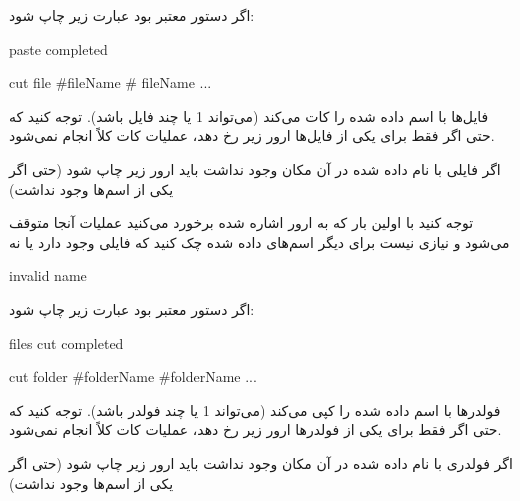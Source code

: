 \documentclass[]{article}
\begin{document}
اگر دستور معتبر بود عبارت زیر چاپ شود:

\begin{tcolorbox}[boxrule=0pt]
	\begin{latin}
  	  \large{
 paste completed
		}
	\end{latin}
\end{tcolorbox}

\begin{tcolorbox}[boxrule=0pt]
	\begin{latin}
  	  \large{
 cut file \#fileName \# fileName ...
		}
	\end{latin}
\end{tcolorbox}


فایل‌ها با اسم داده شده را کات می‌کند (می‌تواند 1 یا چند فایل باشد). توجه کنید که حتی اگر فقط برای یکی از فایل‌ها ارور زیر رخ دهد، عملیات کات کلاً انجام نمی‌شود.

اگر فایلی با نام داده شده در آن مکان وجود نداشت باید ارور زیر چاپ شود (حتی اگر یکی از اسم‌ها وجود نداشت)

توجه کنید با اولین بار که به ارور اشاره شده برخورد می‌کنید عملیات آنجا متوقف می‌شود و نیازی نیست برای دیگر اسم‌های داده شده چک کنید که فایلی وجود دارد یا نه


\begin{tcolorbox}[boxrule=0pt]
	\begin{latin}
  	  \large{
 invalid name
		}
	\end{latin}
\end{tcolorbox}



اگر دستور معتبر بود عبارت زیر چاپ شود:

\begin{tcolorbox}[boxrule=0pt]
	\begin{latin}
  	  \large{
files cut completed
		}
	\end{latin}
\end{tcolorbox}


\begin{tcolorbox}[boxrule=0pt]
	\begin{latin}
  	  \large{
cut folder \#folderName \#folderName ...
		}
	\end{latin}
\end{tcolorbox}

فولدرها با اسم داده شده را کپی می‌کند (می‌تواند 1 یا چند فولدر باشد). توجه کنید که حتی اگر فقط برای یکی از فولدرها ارور زیر رخ دهد، عملیات کات کلاً انجام نمی‌شود.


اگر فولدری با نام داده شده در آن مکان وجود نداشت باید ارور زیر چاپ شود (حتی اگر یکی از اسم‌ها وجود نداشت)
\end{document}
